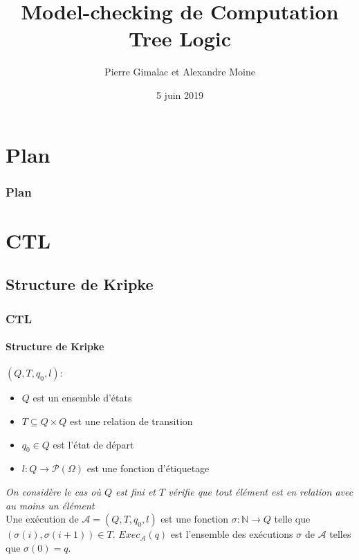 \documentclass[11pt]{beamer}
\author{Pierre Gimalac et Alexandre Moine}
\begin{document}
\title{Model-checking de Computation Tree Logic}
\date{5 juin 2019}

\begin{frame}[plain]
	\maketitle
\end{frame}

\section*{Plan}

\begin{frame}
	\frametitle{Plan}
    \small
	\tableofcontents[]
\end{frame}

\section{CTL}
\subsection{Structure de Kripke}
\begin{frame}
    \frametitle{CTL}
    \framesubtitle{Structure de Kripke}

    $(Q,T, q_0, l)$:
    \begin{itemize}
    \item $Q$ est un ensemble d'états
    \item $T \subseteq Q \times Q$ est une relation de transition
    \item $q_0 \in Q$ est l'état de départ
    \item $l : Q \to \mathcal{P}(\Omega)$ est une fonction d'étiquetage
    \end{itemize}

    \pause
    \bigskip
    \textit{On considère le cas où $Q$ est fini et $T$ vérifie que tout élément est en relation avec au moins un élément}\\
    \pause
    \bigskip
    Une exécution de $\mathcal{A} = (Q, T, q_0, l)$ est une fonction $\sigma : \mathbb{N} \to Q$ telle que $(\sigma(i), \sigma(i+1))\in T$. $Exec_\mathcal{A}(q)$ est l'ensemble des exécutions $\sigma$ de $\mathcal{A}$ telles que $\sigma(0) = q$.
\end{frame}
\end{document}

